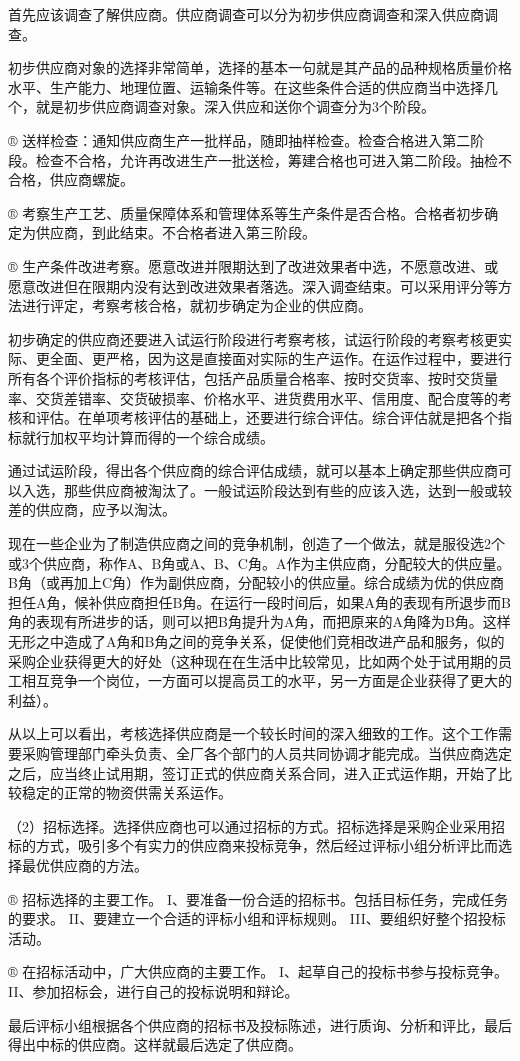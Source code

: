     首先应该调查了解供应商。供应商调查可以分为初步供应商调查和深入供应商调查。

    初步供应商对象的选择非常简单，选择的基本一句就是其产品的品种规格质量价格水平、生产能力、地理位置、运输条件等。在这些条件合适的供应商当中选择几个，就是初步供应商调查对象。深入供应和送你个调查分为3个阶段。

    ® 送样检查：通知供应商生产一批样品，随即抽样检查。检查合格进入第二阶段。检查不合格，允许再改进生产一批送检，筹建合格也可进入第二阶段。抽检不合格，供应商螺旋。

    ® 考察生产工艺、质量保障体系和管理体系等生产条件是否合格。合格者初步确定为供应商，到此结束。不合格者进入第三阶段。

    ® 生产条件改进考察。愿意改进并限期达到了改进效果者中选，不愿意改进、或愿意改进但在限期内没有达到改进效果者落选。深入调查结束。可以采用评分等方法进行评定，考察考核合格，就初步确定为企业的供应商。

    初步确定的供应商还要进入试运行阶段进行考察考核，试运行阶段的考察考核更实际、更全面、更严格，因为这是直接面对实际的生产运作。在运作过程中，要进行所有各个评价指标的考核评估，包括产品质量合格率、按时交货率、按时交货量率、交货差错率、交货破损率、价格水平、进货费用水平、信用度、配合度等的考核和评估。在单项考核评估的基础上，还要进行综合评估。综合评估就是把各个指标就行加权平均计算而得的一个综合成绩。

    通过试运阶段，得出各个供应商的综合评估成绩，就可以基本上确定那些供应商可以入选，那些供应商被淘汰了。一般试运阶段达到有些的应该入选，达到一般或较差的供应商，应予以淘汰。

    现在一些企业为了制造供应商之间的竞争机制，创造了一个做法，就是服役选2个或3个供应商，称作A、B角或A、B、C角。A作为主供应商，分配较大的供应量。B角（或再加上C角）作为副供应商，分配较小的供应量。综合成绩为优的供应商担任A角，候补供应商担任B角。在运行一段时间后，如果A角的表现有所退步而B角的表现有所进步的话，则可以把B角提升为A角，而把原来的A角降为B角。这样无形之中造成了A角和B角之间的竞争关系，促使他们竞相改进产品和服务，似的采购企业获得更大的好处（这种现在在生活中比较常见，比如两个处于试用期的员工相互竞争一个岗位，一方面可以提高员工的水平，另一方面是企业获得了更大的利益）。

    从以上可以看出，考核选择供应商是一个较长时间的深入细致的工作。这个工作需要采购管理部门牵头负责、全厂各个部门的人员共同协调才能完成。当供应商选定之后，应当终止试用期，签订正式的供应商关系合同，进入正式运作期，开始了比较稳定的正常的物资供需关系运作。

    （2）招标选择。选择供应商也可以通过招标的方式。招标选择是采购企业采用招标的方式，吸引多个有实力的供应商来投标竞争，然后经过评标小组分析评比而选择最优供应商的方法。

    ® 招标选择的主要工作。
    I、要准备一份合适的招标书。包括目标任务，完成任务的要求。
    II、要建立一个合适的评标小组和评标规则。
    III、要组织好整个招投标活动。

    ® 在招标活动中，广大供应商的主要工作。
    I、起草自己的投标书参与投标竞争。
    II、参加招标会，进行自己的投标说明和辩论。

    最后评标小组根据各个供应商的招标书及投标陈述，进行质询、分析和评比，最后得出中标的供应商。这样就最后选定了供应商。
